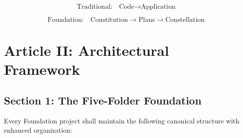 \documentclass[12pt,letterpaper]{article}
\begin{document}
\begin{equation}
\text{Traditional:} \quad \text{Code} \rightarrow \text{Application}
\end{equation}

\begin{equation}
\text{Foundation:} \quad \text{Constitution} \rightarrow \text{Plans} \rightarrow \text{Constellation}
\end{equation}

\section{Article II: Architectural Framework}

\subsection{Section 1: The Five-Folder Foundation}

Every Foundation project shall maintain the following canonical structure with enhanced organization:
\end{document}
